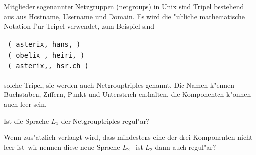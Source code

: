 Mitglieder sogenannter Netzgruppen (netgroups) in Unix sind Tripel
bestehend aus aus Hostname, Username und Domain. Es wird die "ubliche
mathematische Notation f"ur Tripel verwendet, zum Beispiel sind
\begin{center}
\begin{tabular}{l}
{\tt ( asterix, hans, )}\\
{\tt ( obelix , heiri, )}\\
{\tt ( asterix,, hsr.ch )}
\end{tabular}
\end{center}
solche Tripel, sie werden auch Netgrouptriples genannt.
Die Namen k"onnen Buchstaben, Ziffern, Punkt und Unterstrich
enthalten, die Komponenten k"onnen auch leer sein.
\begin{teilaufgaben}
\item
Ist die Sprache $L_1$ der Netgrouptriples regul"ar?
\item
Wenn zus"atzlich verlangt wird, dass mindestens eine der drei
Komponenten nicht leer ist--wir nennen diese neue Sprache $L_2$-- ist $L_2$
dann auch regul"ar?
\end{teilaufgaben}


